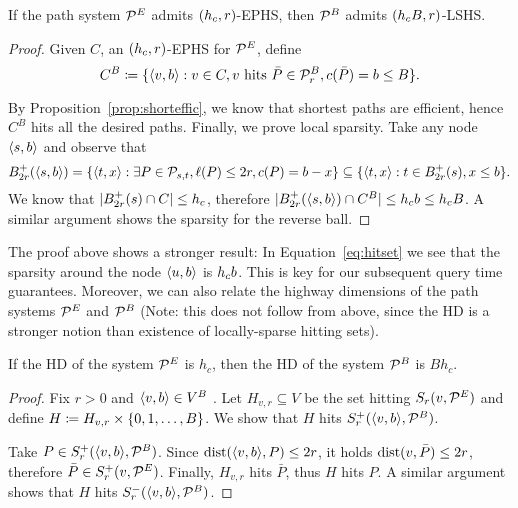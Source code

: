 \begin{proposition}
	If the path system $\mathcal{P}^E$ admits $(h_c,r)$-EPHS, then $\mathcal{P}^B$ admits $(h_c B,r)$-LSHS.
\end{proposition}
\begin{proof}
	Given $C$, an $(h_c,r)$-EPHS for $\mathcal{P}^E$, define
	\begin{equation}\label{eq:hitset}
	C^B\coloneqq \{\langle v,b\rangle: v\in C, v \text{ hits }\bar P\in\mathcal{P}^B_r, c(\bar P)=b\leq B \}.
	\end{equation}
	
	By Proposition~\ref{prop:shorteffic}, we know that shortest paths are efficient, hence $C^B$ hits all the desired paths.
	Finally, we prove local sparsity.
	Take any node $\langle s,b\rangle$ and observe that
	\[
	B^+_{2r}(\langle s,b\rangle) = \{\langle t,x\rangle: \exists P\in\mathcal{P}_{s,t}, \ell(P)\leq 2r, c(P)=b-x\} 
	\subseteq \{\langle t,x\rangle: t\in B^+_{2r}(s), x\leq b\} .
	\]
	We know that $\lvert B^+_{2r}(s)\cap C\rvert\leq h_c$, therefore $\lvert B^+_{2r}(\langle s,b\rangle)\cap C^B\rvert\leq h_c b\leq h_c B$.
	A similar argument shows the sparsity for the reverse ball.
\end{proof}

The proof above shows a stronger result:
In Equation~\eqref{eq:hitset} we see that the sparsity around the node $\langle u,b\rangle$ is $h_c b$.
This is key for our subsequent query time guarantees.
Moreover, we can also relate the highway dimensions of the path systems $\mathcal{P}^E$ and $\mathcal{P}^B$ (Note: this does not follow from above, since the HD is a stronger notion than existence of locally-sparse hitting sets).
\begin{proposition}\label{prop:HDaugmented}
	If the HD of the system $\mathcal{P}^E$ is $h_c$, then the HD of the system $\mathcal{P}^B$ is $Bh_c$.
\end{proposition}
\begin{proof}
	Fix $r>0$ and $\langle v,b\rangle\in V^B$ .
	Let $H_{v,r}\subseteq V$ be the set hitting $S_r(v,\mathcal{P}^E)$ and define $H\coloneqq H_{v,r}\times\{0,1,\ldots,B\}$.
	We show that $H$ hits $S^+_r(\langle v,b\rangle,\mathcal{P}^B)$.
	
	Take $P\in S^+_r(\langle v,b\rangle,\mathcal{P}^B)$.
	Since $\mbox{dist}(\langle v,b\rangle,P)\leq 2r$, it holds $\mbox{dist}(v,\bar P)\leq 2r$, therefore $\bar P\in S^+_r(v,\mathcal{P}^E)$.
	Finally, $H_{v,r}$ hits $\bar P$, thus $H$ hits $P$.
	A similar argument shows that $H$ hits $S^-_r(\langle v,b\rangle,\mathcal{P}^B)$.
\end{proof}


